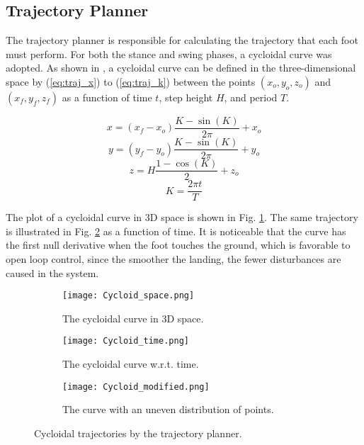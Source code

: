 \documentclass[conference]{IEEEtran}
\begin{document}
\subsection{Trajectory Planner}

The trajectory planner is responsible for calculating the trajectory that each foot must perform. For both the stance and swing phases, a cycloidal curve was adopted. As shown in \cite{Shi2021}, a cycloidal curve can be defined in the three-dimensional space by (\ref{eq:traj_x}) to (\ref{eq:traj_k})
between the points $(x_o, y_o, z_o)$ and $(x_f, y_f, z_f)$ as a function of time $t$, step height $H$, and period $T$.

\begin{equation}
  x = (x_f - x_o) \frac{K - \sin{(K)}}{2 \pi} + x_o
  \label{eq:traj_x}
\end{equation}
\begin{equation}
  y = (y_f - y_o) \frac{K - \sin{(K)}}{2 \pi} + y_o
  \label{eq:traj_y}
\end{equation}
\begin{equation}
  z = H \frac{1 - \cos{(K)}}{2} + z_o
  \label{eq:traj_z}
\end{equation}
\begin{equation}
  K = \frac{2 \pi t}{T}
  \label{eq:traj_k}
\end{equation}

The plot of a cycloidal curve in 3D space is shown in Fig. \ref{fig:traj_space}. The same trajectory is illustrated in Fig. \ref{fig:traj_time} as a function of time. It is noticeable that the curve has the first null derivative when the foot touches the ground, which is favorable to open loop control, since the smoother the landing, the fewer disturbances are caused in the system.

\begin{figure*}[h]
  \centering
  \begin{subfigure}[t]{0.32\textwidth}
    \centering
    \texttt{[image: Cycloid\_space.png]}
    \caption{The cycloidal curve in 3D space.}
    \label{fig:traj_space}
  \end{subfigure}
  \begin{subfigure}[t]{0.32\textwidth}
    \centering
    \texttt{[image: Cycloid\_time.png]}
    \caption{The cycloidal curve w.r.t. time.}
    \label{fig:traj_time}
  \end{subfigure}
  \begin{subfigure}[t]{0.32\textwidth}
    \centering
    \texttt{[image: Cycloid\_modified.png]}
    \caption{The curve with an uneven distribution of points.}
    \label{fig:traj_time_modified}
  \end{subfigure}
  \vfill
  \caption{Cycloidal trajectories by the trajectory planner.}
  \label{fig:traj_curve}
  \vspace{-\baselineskip}
\end{figure*}
\end{document}
